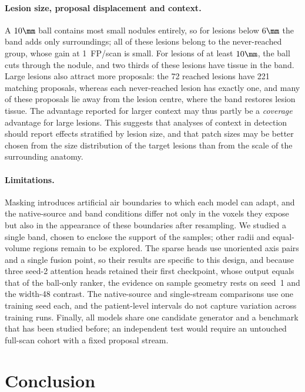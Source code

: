 \paragraph{Lesion size, proposal displacement and context.}
A $10\mm$ ball contains most small nodules entirely, so for lesions below $6\mm$ the band adds only surroundings; all of these lesions belong to the never-reached group, whose gain at 1~FP/scan is small. For lesions of at least $10\mm$, the ball cuts through the nodule, and two thirds of these lesions have tissue in the band. Large lesions also attract more proposals: the 72 reached lesions have 221 matching proposals, whereas each never-reached lesion has exactly one, and many of these proposals lie away from the lesion centre, where the band restores lesion tissue. The advantage reported for larger context may thus partly be a \emph{coverage} advantage for large lesions. This suggests that analyses of context in detection should report effects stratified by lesion size, and that patch sizes may be better chosen from the size distribution of the target lesions than from the scale of the surrounding anatomy.

\paragraph{Limitations.}
Masking introduces artificial air boundaries to which each model can adapt, and the native-source and band conditions differ not only in the voxels they expose but also in the appearance of these boundaries after resampling. We studied a single band, chosen to enclose the support of the samples; other radii and equal-volume regions remain to be explored. The sparse heads use unoriented axis pairs and a single fusion point, so their results are specific to this design, and because three seed-2 attention heads retained their first checkpoint, whose output equals that of the ball-only ranker, the evidence on sample geometry rests on seed~1 and the width-48 contrast. The native-source and single-stream comparisons use one training seed each, and the patient-level intervals do not capture variation across training runs. Finally, all models share one candidate generator and a benchmark that has been studied before; an independent test would require an untouched full-scan cohort with a fixed proposal stream.

\section{Conclusion}
\label{sec:conclusion}

